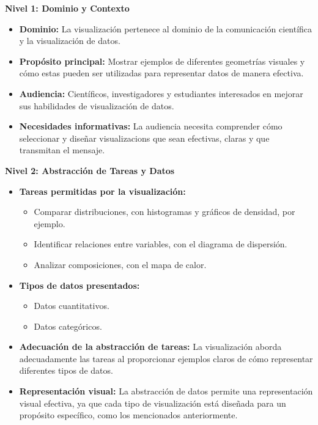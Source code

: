 \textbf{Nivel 1: Dominio y Contexto}
\begin{itemize}[label=\textbullet]
    \item \textbf{Dominio:} La visualización pertenece al dominio de la comunicación científica y la visualización de datos.
    \item \textbf{Propósito principal:} Mostrar ejemplos de diferentes geometrías visuales y cómo estas pueden ser utilizadas para representar datos de manera efectiva.
    \item \textbf{Audiencia:} Científicos, investigadores y estudiantes interesados en mejorar sus habilidades de visualización de datos.
    \item \textbf{Necesidades informativas:} La audiencia necesita comprender cómo seleccionar y diseñar visualizacions que sean efectivas, claras y que transmitan el mensaje.
\end{itemize}
\textbf{Nivel 2: Abstracción de Tareas y Datos}
\begin{itemize}[label=\textbullet]
    \item \textbf{Tareas permitidas por la visualización:} 
        \begin{itemize}[label=\textbullet]
            \item Comparar distribuciones, con histogramas y gráficos de densidad, por ejemplo.
            \item Identificar relaciones entre variables, con el diagrama de dispersión.
            \item Analizar composiciones, con el mapa de calor.
        \end{itemize}
    \item \textbf{Tipos de datos presentados:}
        \begin{itemize}[label=\textbullet]
            \item Datos cuantitativos.
            \item Datos categóricos.
        \end{itemize}
    \item \textbf{Adecuación de la abstracción de tareas:} La visualización aborda adecuadamente las tareas al proporcionar ejemplos claros de cómo representar diferentes tipos de datos.
    \item \textbf{Representación visual:} La abstracción de datos permite una representación visual efectiva, ya que cada tipo de visualización está diseñada para un propósito específico, como los mencionados anteriormente. 
\end{itemize}
